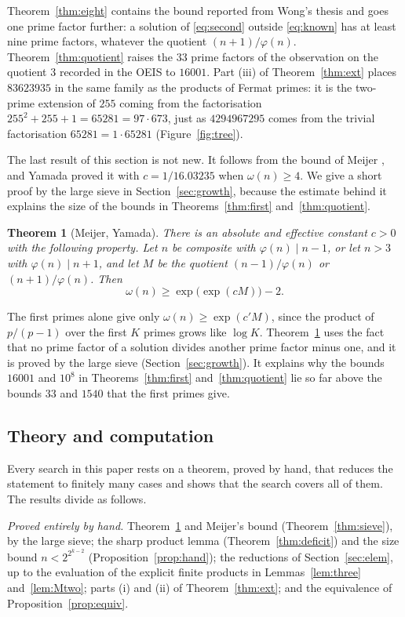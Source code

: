 \documentclass[screen,reqno]{aomart}
\numberwithin{equation}{section}
\theoremstyle{plain}
\newtheorem{theorem}{Theorem}[section]
\theoremstyle{definition}
\theoremstyle{remark}
\begin{document}
Theorem~\ref{thm:eight} contains the bound reported from Wong's
thesis and goes one prime factor further: a solution of
\eqref{eq:second} outside \eqref{eq:known} has at least nine prime
factors, whatever the quotient $(n+1)/\varphi(n)$. Theorem~\ref{thm:quotient}
raises the $33$ prime factors of the observation on the quotient $3$
recorded in the OEIS to $16001$. Part (iii) of
Theorem~\ref{thm:ext} places $83623935$ in the same family as the
products of Fermat primes: it is the two-prime extension of $255$
coming from the factorisation $255^2+255+1=65281=97\cdot673$, just as
$4294967295$ comes from the trivial factorisation $65281=1\cdot65281$
(Figure~\ref{fig:tree}).

The last result of this section is not new. It follows from the bound
of Meijer \cite{Mei74}, and Yamada \cite{Yam23} proved it with
$c=1/16.03235$ when $\omega(n)\ge4$. We give a short proof by the
large sieve in Section~\ref{sec:growth}, because the estimate behind it
explains the size of the bounds in Theorems~\ref{thm:first}
and~\ref{thm:quotient}.

\begin{theorem}[Meijer, Yamada]\label{thm:doubly}
There is an absolute and effective constant $c>0$ with the following
property. Let $n$ be composite with $\varphi(n)\mid n-1$, or let $n>3$
with $\varphi(n)\mid n+1$, and let $M$ be the quotient
$(n-1)/\varphi(n)$ or $(n+1)/\varphi(n)$. Then
\[
  \omega(n)\ge\exp\bigl(\exp(cM)\bigr)-2 .
\]
\end{theorem}

The first primes alone give only $\omega(n)\ge\exp(c'M)$, since the
product of $p/(p-1)$ over the first $K$ primes grows like $\log K$.
Theorem~\ref{thm:doubly} uses the fact that no prime factor of a
solution divides another prime factor minus one, and it is proved by
the large sieve (Section~\ref{sec:growth}). It explains why the bounds
$16001$ and $10^8$ in Theorems~\ref{thm:first} and~\ref{thm:quotient}
lie so far above the bounds $33$ and $1540$ that the first primes give.

\subsection{Theory and computation}
Every search in this paper rests on a theorem, proved by hand, that
reduces the statement to finitely many cases and shows that the search
covers all of them. The results divide as follows.

\emph{Proved entirely by hand.} Theorem~\ref{thm:doubly} and Meijer's
bound (Theorem~\ref{thm:sieve}), by the large sieve; the sharp product lemma
(Theorem~\ref{thm:deficit}) and the size bound $n<2^{2^{k-2}}$
(Proposition~\ref{prop:hand}); the reductions of
Section~\ref{sec:elem}, up to the evaluation of the explicit finite
products in Lemmas~\ref{lem:three} and~\ref{lem:Mtwo}; parts (i) and
(ii) of Theorem~\ref{thm:ext}; and the equivalence of
Proposition~\ref{prop:equiv}.
\end{document}
